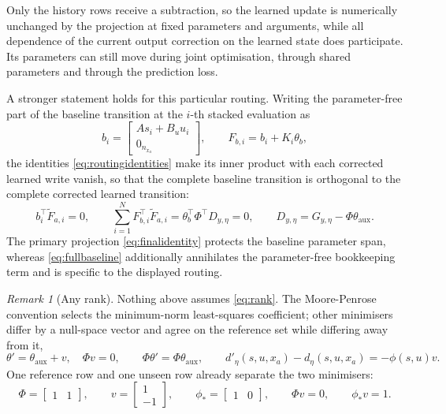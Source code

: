 \documentclass[11pt,a4paper]{article}
\theoremstyle{remark}
\newtheorem{remark}{Remark}
\begin{document}
Only the history rows receive a subtraction, so the learned update is numerically unchanged by the
projection at fixed parameters and arguments, while all dependence of the current output
correction on the learned state does participate. Its parameters can still move during joint
optimisation, through shared parameters and through the prediction loss.

A stronger statement holds for this particular routing. Writing the parameter-free part of the
baseline transition at the \(i\)-th stacked evaluation as
\begin{equation*}
b_i=\begin{bmatrix}As_i+B_uu_i\\0_{n_{x_a}}\end{bmatrix},\qquad
F_{b,i}=b_i+K_i\theta_b,
\end{equation*}
the identities \eqref{eq:routingidentities} make its inner product with each corrected learned
write vanish, so that the complete baseline transition is orthogonal to the complete corrected
learned transition:
\begin{equation}\label{eq:fullbaseline}
b_i^\top\widetilde F_{a,i}=0,\qquad
\sum_{i=1}^NF_{b,i}^\top\widetilde F_{a,i}=\theta_b^\top\Phi^\top D_{y,\eta}=0,
\qquad D_{y,\eta}=G_{y,\eta}-\Phi\theta_{\mathrm{aux}}.
\end{equation}
The primary projection \eqref{eq:finalidentity} protects the baseline parameter span, whereas
\eqref{eq:fullbaseline} additionally annihilates the parameter-free bookkeeping term and is
specific to the displayed routing.

\begin{remark}[Any rank]\label{rem:rank}
Nothing above assumes \eqref{eq:rank}. The Moore-Penrose convention selects the minimum-norm
least-squares coefficient; other minimisers differ by a null-space vector and agree on the
reference set while differing away from it,
\begin{equation*}
\theta'=\theta_{\mathrm{aux}}+v,\quad\Phi v=0,\qquad
\Phi\theta'=\Phi\theta_{\mathrm{aux}},\qquad
d'_\eta(s,u,x_a)-d_\eta(s,u,x_a)=-\phi(s,u)v.
\end{equation*}
One reference row and one unseen row already separate the two minimisers:
\begin{equation*}
\Phi=\begin{bmatrix}1&1\end{bmatrix},\qquad
v=\begin{bmatrix}1\\-1\end{bmatrix},\qquad
\phi_*=\begin{bmatrix}1&0\end{bmatrix},\qquad
\Phi v=0,\qquad \phi_*v=1.
\end{equation*}
\end{remark}
\end{document}
